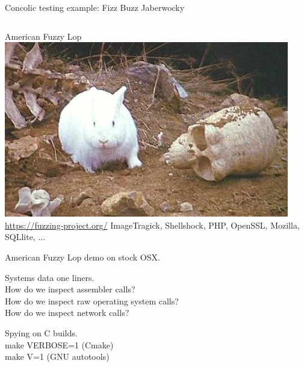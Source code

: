 \documentclass{beamer}
\begin{document}
\begin{frame}[fragile]
Concolic testing example:\newline\newline
Fizz Buzz Jaberwocky
\end{frame}

\begin{frame}[fragile]
\inputminted{Python}{jabberwocky.py}

\end{frame}


\begin{frame}[fragile]
American Fuzzy Lop
\includegraphics[scale=0.5]{killerRabbit}
\newline\url{https://fuzzing-project.org/}
\newline ImageTragick, Shellshock, PHP, OpenSSL, Mozilla, SQLlite, ...
\end{frame}

\begin{frame}[fragile]
American Fuzzy Lop demo on stock OSX.
\end{frame}


\begin{frame}[fragile]
Systems data one liners.\\
How do we inspect assembler calls?\\
How do we inspect raw operating system calls?\\
How do we inspect network calls?\\
\end{frame}

\begin{frame}[fragile]
Spying on C builds.\\
make VERBOSE=1 (Cmake)\\ 
make V=1 (GNU autotools)
\end{frame}
\end{document}
